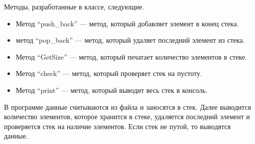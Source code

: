 \documentclass[12pt, a4paper]{article}
\begin{document}
Методы, разработанные в классе, следующие.
\begin{itemize}
    \item[---] Метод ``push\_back'' --- метод, который добавляет элемент в конец стека.
    \item[---] метод ``pop\_back'' --- метод, который удаляет последний элемент из стека.
    \item[---] Метод ``GetSize'' --- метод, который печатает количество элементов в стеке.
    \item[---] Метод ``check'' --- метод, который проверяет стек на пустоту.
    \item[---] Метод ``print'' --- метод, который выводит весь стек в консоль.
\end{itemize}
В программе данные считываются из файла и заносятся в стек. Далее выводится количество элементов, которое хранится в стеке, удаляется последний элемент и проверяется стек на наличие элементов. Если стек не путой, то выводятся данные.
\end{document}
